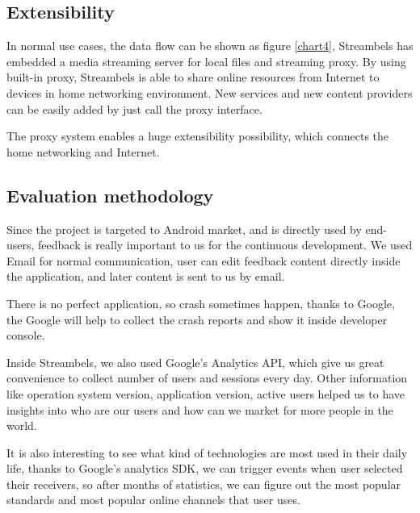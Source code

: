 \subsection{Extensibility}
In normal use cases, the data flow can be shown as figure \ref{chart4},
Streambels has embedded a media streaming server for local files and streaming
proxy. By using built-in proxy, Streambels is able to share online resources
from Internet to devices in home networking environment. New services and new
content providers can be easily added by just call the proxy interface.

The proxy system enables a huge extensibility possibility, which connects the
home networking and Internet.

\subsection{Evaluation methodology}
Since the project is targeted to Android market, and is directly used by
end-users, feedback is really important to us for the continuous development. We
used Email for normal communication, user can edit feedback content directly
inside the application, and later content is sent to us by email.

There is no perfect application, so crash sometimes happen, thanks to Google,
the Google will help to collect the crash reports and show it inside developer
console.

Inside Streambels, we also used Google's Analytics API, which give us
great convenience to collect number of users and sessions every day. Other
information like operation system version, application version, active users
helped us to have insights into who are our users and how can we market for more
people in the world.

It is also interesting to see what kind of technologies are most used in their
daily life, thanks to Google's analytics SDK, we can trigger events when user
selected their receivers, so after months of statistics, we can figure out the
most popular standards and most popular online channels that user uses.


